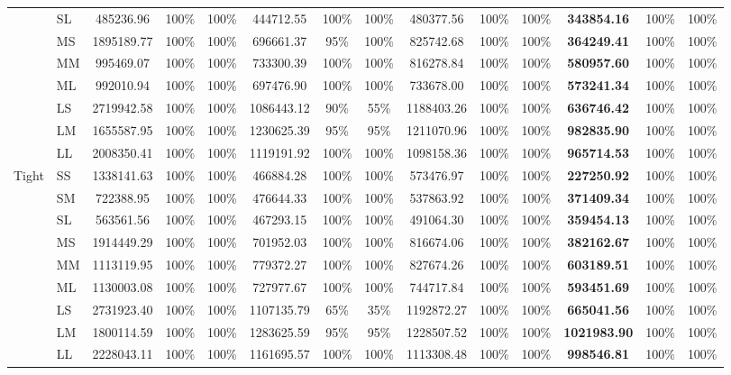 \documentclass[journal]{IEEEtran}
\begin{document}
\begin{table}[!t]
\begin{tabular*}{\textwidth}{@{\extracolsep{\fill}}ll*{4}{ccc}@{}}
 & SL & 485236.96 & 100\% & 100\% & 444712.55 & 100\% & 100\% & 480377.56 & 100\% & 100\% & \textbf{343854.16} & 100\% & 100\% \\
 & MS & 1895189.77 & 100\% & 100\% & 696661.37 & 95\% & 100\% & 825742.68 & 100\% & 100\% & \textbf{364249.41} & 100\% & 100\% \\
 & MM & 995469.07 & 100\% & 100\% & 733300.39 & 100\% & 100\% & 816278.84 & 100\% & 100\% & \textbf{580957.60} & 100\% & 100\% \\
 & ML & 992010.94 & 100\% & 100\% & 697476.90 & 100\% & 100\% & 733678.00 & 100\% & 100\% & \textbf{573241.34} & 100\% & 100\% \\
 & LS & 2719942.58 & 100\% & 100\% & 1086443.12 & 90\% & 55\% & 1188403.26 & 100\% & 100\% & \textbf{636746.42} & 100\% & 100\% \\
 & LM & 1655587.95 & 100\% & 100\% & 1230625.39 & 95\% & 95\% & 1211070.96 & 100\% & 100\% & \textbf{982835.90} & 100\% & 100\% \\
 & LL & 2008350.41 & 100\% & 100\% & 1119191.92 & 100\% & 100\% & 1098158.36 & 100\% & 100\% & \textbf{965714.53} & 100\% & 100\% \\
\midrule
Tight & SS & 1338141.63 & 100\% & 100\% & 466884.28 & 100\% & 100\% & 573476.97 & 100\% & 100\% & \textbf{227250.92} & 100\% & 100\% \\
 & SM & 722388.95 & 100\% & 100\% & 476644.33 & 100\% & 100\% & 537863.92 & 100\% & 100\% & \textbf{371409.34} & 100\% & 100\% \\
 & SL & 563561.56 & 100\% & 100\% & 467293.15 & 100\% & 100\% & 491064.30 & 100\% & 100\% & \textbf{359454.13} & 100\% & 100\% \\
 & MS & 1914449.29 & 100\% & 100\% & 701952.03 & 100\% & 100\% & 816674.06 & 100\% & 100\% & \textbf{382162.67} & 100\% & 100\% \\
 & MM & 1113119.95 & 100\% & 100\% & 779372.27 & 100\% & 100\% & 827674.26 & 100\% & 100\% & \textbf{603189.51} & 100\% & 100\% \\
 & ML & 1130003.08 & 100\% & 100\% & 727977.67 & 100\% & 100\% & 744717.84 & 100\% & 100\% & \textbf{593451.69} & 100\% & 100\% \\
 & LS & 2731923.40 & 100\% & 100\% & 1107135.79 & 65\% & 35\% & 1192872.27 & 100\% & 100\% & \textbf{665041.56} & 100\% & 100\% \\
 & LM & 1800114.59 & 100\% & 100\% & 1283625.59 & 95\% & 95\% & 1228507.52 & 100\% & 100\% & \textbf{1021983.90} & 100\% & 100\% \\
 & LL & 2228043.11 & 100\% & 100\% & 1161695.57 & 100\% & 100\% & 1113308.48 & 100\% & 100\% & \textbf{998546.81} & 100\% & 100\% \\
\bottomrule
\end{tabular*}
\end{table}
\end{document}
